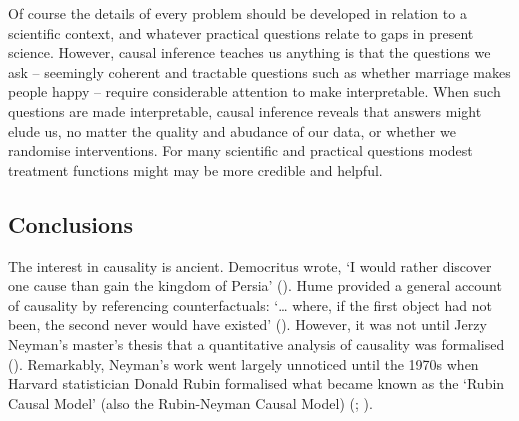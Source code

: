 \documentclass[
  single column]{article}
\begin{document}
Of course the details of every problem should be developed in relation
to a scientific context, and whatever practical questions relate to gaps
in present science. However, causal inference teaches us anything is
that the questions we ask -- seemingly coherent and tractable questions
such as whether marriage makes people happy -- require considerable
attention to make interpretable. When such questions are made
interpretable, causal inference reveals that answers might elude us, no
matter the quality and abudance of our data, or whether we randomise
interventions. For many scientific and practical questions modest
treatment functions might may be more credible and helpful.

\subsection{Conclusions}\label{conclusions}

The interest in causality is ancient. Democritus wrote, `I would rather
discover one cause than gain the kingdom of Persia'
(). Hume provided a
general account of causality by referencing counterfactuals: `\ldots{}
where, if the first object had not been, the second never would have
existed' (). However, it was not until
Jerzy Neyman's master's thesis that a quantitative analysis of causality
was formalised (). Remarkably, Neyman's work went largely unnoticed until the 1970s
when Harvard statistician Donald Rubin formalised what became known as
the `Rubin Causal Model' (also the Rubin-Neyman Causal Model)
(;
).
\end{document}
